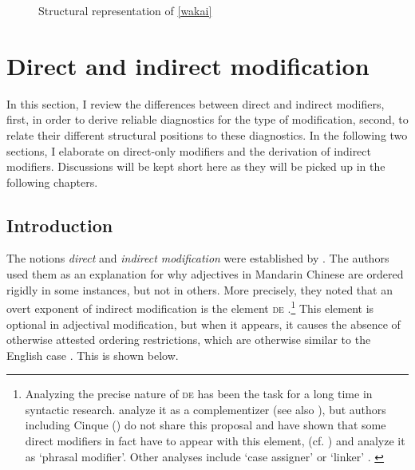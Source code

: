 \begin{figure}
\centering
{}
\caption{Structural representation of \ref{wakai}}
\label{tree wakai}
\end{figure}

\section{Direct and indirect modification} \label{cartography Cinque}

In this section, I review the differences between direct and indirect modifiers, first, in order to derive reliable diagnostics for the type of modification, second, to relate their different structural positions to these diagnostics. In the following two sections, I elaborate on direct-only modifiers and the derivation of indirect modifiers. Discussions will be kept short here as they will be picked up in the following chapters.

\subsection{Introduction}

The notions \textit{direct} and \textit{indirect modification} were established by \citet{sproat:1991:the}. The authors used them as an explanation for why adjectives in  Mandarin Chinese are ordered rigidly in some instances, but not in others. More precisely, they noted that an overt exponent of indirect modification is the element \textsc{de}  \citep[§ 2]{sproat:1991:the}.\footnote{Analyzing the precise nature of \textsc{de} has been the task for a long time in syntactic research. \citet{sproat:1991:the} analyze it as a complementizer (see also \citealt{gobbo:2010:on}), but authors including Cinque (\citeyear{cinque:2010:adj}) do not share this proposal and have shown that some direct modifiers in fact have to appear with this element, (cf. \citealt{paul:2005:adj, paul:2010:adj, paul:2012:why, yang:2005:plurality}) and analyze it as `phrasal modifier'. Other analyses include `case assigner' \citep{larson:2009:chinese} or `linker' \citep{dikken:2004:complex}. \label{demandarin}} This element is optional in adjectival modification, but when it appears, it causes the absence of otherwise attested ordering restrictions, which are otherwise similar to the English case \citep[579]{sproat:1991:the}. This is shown below.

